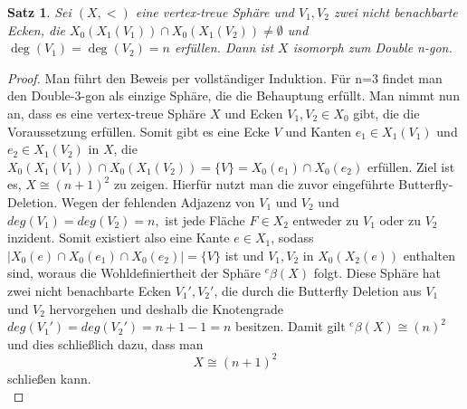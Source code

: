 \documentclass[12pt,titlepage,twoside,cleardoublepage]{article}
\theoremstyle{nummermitklammern}
\newtheorem{satz}[temp]{Satz}
\newtheorem{satz}[zahl]{Satz}
\numberwithin{equation}{section}
\begin{document}
\begin{satz}\label{ngon}
Sei $(X,<)$ eine vertex-treue Sphäre und $V_1,V_2$ zwei nicht benachbarte Ecken, die  $X_0(X_1(V_1))\cap X_0(X_1(V_2))\neq \emptyset$ und $\deg(V_1)=\deg(V_2)= n$ erfüllen. Dann ist $X$ isomorph zum Double n-gon.
\end{satz}
\begin{proof}
Man führt den Beweis per vollständiger Induktion. Für n=3 findet man den Double-3-gon als einzige Sphäre, die die Behauptung erfüllt. Man nimmt nun an, dass es eine vertex-treue Sphäre $X$ und Ecken $V_1,V_2\in X_0$ gibt, die die Voraussetzung erfüllen. Somit gibt es eine Ecke $V$ und Kanten $e_1\in X_1(V_1)$ und $e_2 \in X_1(V_2)$ in $X$, die $X_0(X_1(V_1))\cap X_0(X_1(V_2))=\{V\}=X_0(e_1)\cap X_0(e_2)$ erfüllen.
 Ziel ist es, $X\cong (n+1)^2$ zu zeigen. Hierfür nutzt man die zuvor eingeführte Butterfly-Deletion. Wegen der fehlenden Adjazenz von $V_1$ und $V_2$ und $deg(V_1)=deg(V_2)= n,$ ist jede Fläche $F\in X_2$ entweder zu $V_1$ oder zu $V_2$ inzident. Somit existiert also eine Kante $e\in X_1$, sodass $\vert X_0(e)\cap X_0(e_1)\cap X_0(e_2)\vert  =\{V\}$
 ist und $V_1,V_2$ in $X_0(X_2(e))$ enthalten sind, woraus die Wohldefiniertheit der Sphäre ${{}^e\beta(X)}$ folgt. Diese  Sphäre hat zwei nicht benachbarte Ecken $V_1',V_2'$, die durch die Butterfly Deletion aus $V_1$ und $V_2$ hervorgehen und deshalb die Knotengrade $deg(V_1')=deg(V_2')=n+1-1=n$ besitzen. Damit gilt ${{}^e\beta(X)}\cong (n)^2$ und dies schließlich dazu, dass man
 \[
X\cong (n+1)^2 
 \]
 schließen kann.\\
\end{proof}
\end{document}
